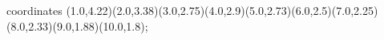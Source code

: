 					coordinates { (1.0,4.22)(2.0,3.38)(3.0,2.75)(4.0,2.9)(5.0,2.73)(6.0,2.5)(7.0,2.25)(8.0,2.33)(9.0,1.88)(10.0,1.8)};